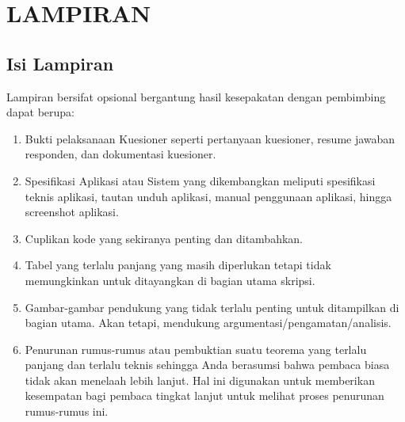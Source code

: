 \chapter*{LAMPIRAN}
\section{Isi Lampiran}

Lampiran bersifat opsional bergantung hasil kesepakatan dengan pembimbing 
dapat berupa:

\begin{enumerate}
\item Bukti pelaksanaan Kuesioner seperti pertanyaan kuesioner, resume jawaban 
responden, dan dokumentasi kuesioner. 
\item Spesifikasi Aplikasi atau Sistem yang dikembangkan meliputi spesifikasi 
teknis aplikasi, tautan unduh aplikasi, manual penggunaan aplikasi, hingga 
screenshot aplikasi. 
\item Cuplikan kode yang sekiranya penting dan ditambahkan. 
\item Tabel yang terlalu panjang yang masih diperlukan tetapi tidak 
memungkinkan untuk ditayangkan di bagian utama skripsi.
\item Gambar-gambar pendukung yang tidak terlalu penting untuk ditampilkan di 
bagian utama. Akan tetapi, mendukung argumentasi/pengamatan/analisis.
\item Penurunan rumus-rumus atau pembuktian suatu teorema yang terlalu 
panjang dan terlalu teknis sehingga Anda berasumsi bahwa pembaca biasa 
tidak akan menelaah lebih lanjut. Hal ini digunakan untuk memberikan 
kesempatan bagi pembaca tingkat lanjut untuk melihat proses penurunan 
rumus-rumus ini.
\end{enumerate}